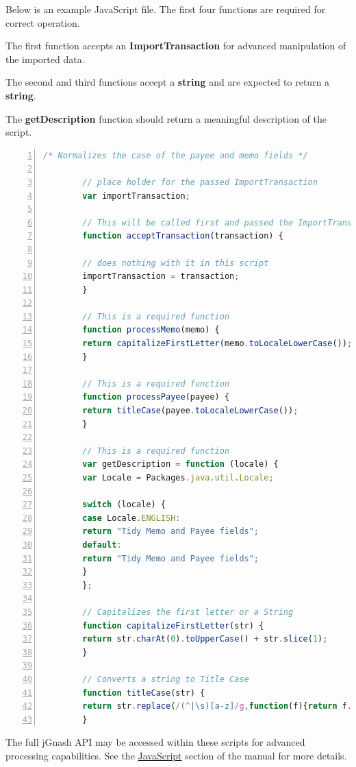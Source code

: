 \documentclass[letterpaper,12pt]{book}
\begin{document}
    \newpage
    Below is an example JavaScript file. The first four functions are required for correct operation.

    The first function accepts an \textbf{ImportTransaction} for advanced manipulation of the imported data.

    The second and third functions accept a \textbf{string} and are expected to return a \textbf{string}.

    The \textbf{getDescription} function should return a meaningful description of the script.
    \\ %
    \begin{lstlisting}[language=JavaScript,numbers=left]
        /* Normalizes the case of the payee and memo fields */

        // place holder for the passed ImportTransaction
        var importTransaction;

        // This will be called first and passed the ImportTransaction
        function acceptTransaction(transaction) {

        // does nothing with it in this script
        importTransaction = transaction;
        }

        // This is a required function
        function processMemo(memo) {
        return capitalizeFirstLetter(memo.toLocaleLowerCase());
        }

        // This is a required function
        function processPayee(payee) {
        return titleCase(payee.toLocaleLowerCase());
        }

        // This is a required function
        var getDescription = function (locale) {
        var Locale = Packages.java.util.Locale;

        switch (locale) {
        case Locale.ENGLISH:
        return "Tidy Memo and Payee fields";
        default:
        return "Tidy Memo and Payee fields";
        }
        };

        // Capitalizes the first letter or a String
        function capitalizeFirstLetter(str) {
        return str.charAt(0).toUpperCase() + str.slice(1);
        }

        // Converts a string to Title Case
        function titleCase(str) {
        return str.replace(/(^|\s)[a-z]/g,function(f){return f.toUpperCase();});
        }
    \end{lstlisting}

    The full jGnash API may be accessed within these scripts for advanced processing capabilities.
    See the \hyperref[sec:javascript]{JavaScript} section of the manual for more details.
\end{document}
